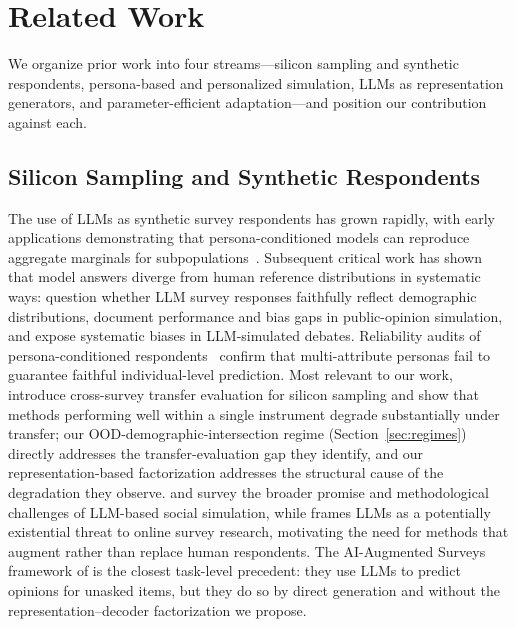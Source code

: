 \section{Related Work}
\label{sec:related-work}

We organize prior work into four streams---silicon sampling and synthetic respondents, persona-based and personalized simulation, LLMs as representation generators, and parameter-efficient adaptation---and position our contribution against each.

\subsection{Silicon Sampling and Synthetic Respondents}
The use of LLMs as synthetic survey respondents has grown rapidly, with early applications demonstrating that persona-conditioned models can reproduce aggregate marginals for subpopulations~\citep{sun2024random,sarstedt2024using}. Subsequent critical work has shown that model answers diverge from human reference distributions in systematic ways: \citet{dominguezolmedo2023questioning} question whether LLM survey responses faithfully reflect demographic distributions, \citet{qu2024performance} document performance and bias gaps in public-opinion simulation, and \citet{taubenfeld2024systematic} expose systematic biases in LLM-simulated debates. Reliability audits of persona-conditioned respondents~\citep{morocho2026assessing} confirm that multi-attribute personas fail to guarantee faithful individual-level prediction. Most relevant to our work, \citet{ku2026silicon} introduce cross-survey transfer evaluation for silicon sampling and show that methods performing well within a single instrument degrade substantially under transfer; our OOD-demographic-intersection regime (Section~\ref{sec:regimes}) directly addresses the transfer-evaluation gap they identify, and our representation-based factorization addresses the structural cause of the degradation they observe. \citet{anthis2025social} and \citet{bail2024generative} survey the broader promise and methodological challenges of LLM-based social simulation, while \citet{westwood2025potential} frames LLMs as a potentially existential threat to online survey research, motivating the need for methods that augment rather than replace human respondents. The AI-Augmented Surveys framework of \citet{kim2023aiaugmented} is the closest task-level precedent: they use LLMs to predict opinions for unasked items, but they do so by direct generation and without the representation--decoder factorization we propose.

